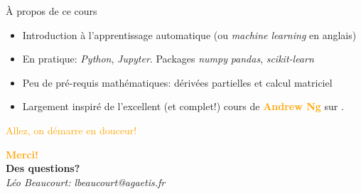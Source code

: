 \documentclass[11pt]{beamer}
\begin{document}
\begin{frame}{À propos de ce cours}
  \begin{itemize}
  \item Introduction à l'apprentissage automatique (ou \textit{machine learning} en anglais)
  \item En pratique: \textit{Python}, \textit{Jupyter}. Packages \textit{numpy} \textit{pandas}, \textit{scikit-learn}
  \item Peu de pré-requis mathématiques: dérivées partielles et calcul matriciel
  \item Largement inspiré de l'excellent (et complet!) cours de \textbf{\textcolor{orange}{Andrew Ng}} sur \href{https://www.coursera.org/learn/machine-learning}{\color{blue}{Coursera}}. 
  \end{itemize}
  
  \vfill
  \begin{center}
    \large
    \textcolor{orange}{Allez, on démarre en douceur!}
  \end{center}
\end{frame}






\begin{frame}
  \begin{center}
    \huge
    \vspace{4cm}
    \textbf{\textcolor{orange}{Merci!}}\\
    \textbf{Des questions?}\\
    \vspace{1cm}
    \normalsize
    \textit{Léo Beaucourt: lbeaucourt@agaetis.fr}
  \end{center}
\end{frame}
\end{document}
